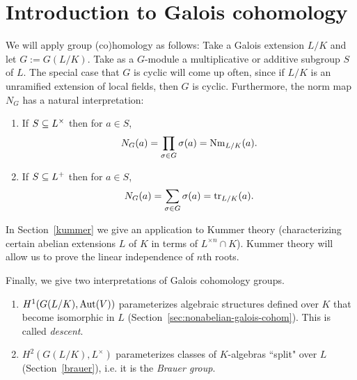 \chapter{Introduction to Galois cohomology}
We will apply group (co)homology as follows: Take a Galois extension $L/K$ and let $G:=G(L/K)$. Take as a $G$-module a multiplicative or additive subgroup $S$ of $L$. The special case that $G$ is cyclic will come up often, since if $L/K$ is an unramified extension of local fields, then $G$ is cyclic. Furthermore, the norm map $N_G$ has a natural interpretation:
\begin{enumerate}
\item
If $S\subseteq L^{\times}$ then for $a\in S$,
\[
N_G(a)=\prod_{\sigma\in G}\sigma(a)=\operatorname{Nm}_{L/K}(a).
\]
\item
If $S\subseteq L^{+}$ then for $a\in S$,
\[
N_G(a)=\sum_{\sigma\in G}\sigma(a)=\operatorname{tr}_{L/K}(a).
\]
\end{enumerate}
In Section~\ref{kummer} we give an application to Kummer theory (characterizing certain abelian extensions $L$ of $K$ in terms of $L^{\times n}\cap K$). Kummer theory will allow us to  prove the linear independence of $n$th roots.

Finally, we give two interpretations of Galois cohomology groups.
\begin{enumerate}
\item
$H^1(G(L/K),\operatorname{Aut}(V))$ parameterizes algebraic structures defined over $K$ that become isomorphic in $L$ (Section~\ref{sec:nonabelian-galois-cohom}). This is called {\it descent}.
\item 
$H^2(G(L/K),L^{\times})$ parameterizes classes of $K$-algebras ``split" over $L$ (Section~\ref{brauer}), i.e. it is the {\it Brauer group}.
\end{enumerate}
